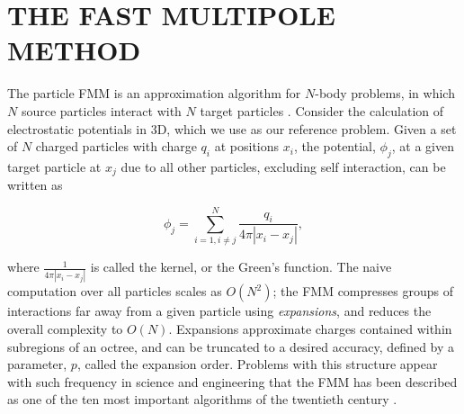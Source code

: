 \documentclass{IEEEcsmag}
\begin{document}


\section{THE FAST MULTIPOLE METHOD}

The particle FMM is an approximation algorithm for $N$-body problems, in which $N$ source particles interact with $N$ target particles \cite{Greengard1987}. Consider the calculation of electrostatic potentials in 3D, which we use as our reference problem. Given a set of $N$ charged particles with charge $q_i$ at positions $x_i$, the potential, $\phi_j$, at a given target particle at $x_j$ due to all other particles, excluding self interaction, can be written as

\begin{equation}
    \phi_j = \sum_{i=1, i \neq j}^{N} \frac{q_i}{4 \pi| x_i-x_j |},
    \label{eq:laplace_kernel}
\end{equation}

\noindent where $\frac{1}{4 \pi| x_i-x_j|}$ is called the kernel, or the Green's function. The naive computation over all particles scales as $O(N^2)$; the FMM compresses groups of interactions far away from a given particle using \textit{expansions}, and reduces the overall complexity to $O(N)$. Expansions approximate charges contained within subregions of an octree, and can be truncated to a desired accuracy, defined by a parameter, $p$, called the expansion order. Problems with this structure appear with such frequency in science and engineering that the FMM has been described as one of the ten most important algorithms of the twentieth century \cite{Dongarra2000}.
\end{document}

